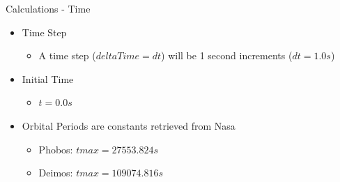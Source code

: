\documentclass{beamer}	%
\begin{document}
\begin{frame}{Calculations - Time}

\begin{itemize}
	\item Time Step
	\begin{itemize}
		\item A time step ($deltaTime = dt$) will be 1 second increments ($dt = 1.0s$)
	\end{itemize}
	\item Initial Time
	\begin{itemize}
		\item $t = 0.0s$
	\end{itemize}
	\item Orbital Periods are constants retrieved from Nasa
	\begin{itemize}
		\item Phobos: $tmax = 27553.824s$
		\item Deimos: $tmax = 109074.816s$
	\end{itemize}
\end{itemize}

\end{frame}
\end{document}
